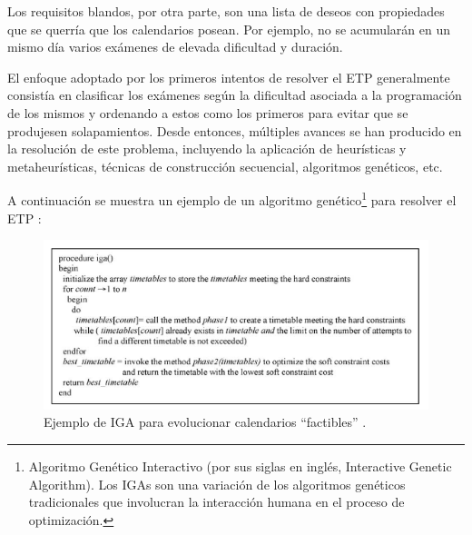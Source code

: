 Los requisitos blandos, por otra parte, son una lista de deseos con propiedades que se querría que los calendarios posean. Por ejemplo, no se acumularán en un mismo día varios exámenes de elevada dificultad y duración.\newline

El enfoque adoptado por los primeros intentos de resolver el ETP generalmente consistía en clasificar los exámenes según la dificultad asociada a la programación de los mismos y ordenando a estos como los primeros para evitar que se produjesen solapamientos. Desde entonces, múltiples avances se han producido en la resolución de este problema, incluyendo la aplicación de heurísticas y metaheurísticas, técnicas de construcción secuencial, algoritmos genéticos, etc.\newpage

A continuación se muestra un ejemplo de un algoritmo genético\footnote{Algoritmo Genético Interactivo (por sus siglas en inglés, Interactive Genetic Algorithm). Los IGAs son una variación de los algoritmos genéticos tradicionales que involucran la interacción humana en el proceso de optimización.} para resolver el ETP \cite{PILLAY2010457}:

\begin{figure}[H]
    \centering
    \includegraphics[width=1\textwidth]{./imagenes/IGA_ETP.png}
    \caption{Ejemplo de IGA para evolucionar calendarios ``factibles'' \cite{PILLAY2010457}.}
\end{figure}

\newpage



